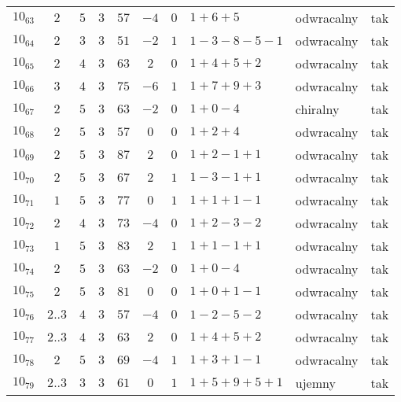 \begin{longtable}{lccccccllc}
$10_{63}$   &  $2$     &  $5$  &  $3$      &  $57$   &  $-4$  &  $0$  &  $1+6+5$        &  odwracalny  &  tak  \\
$10_{64}$   &  $2$     &  $3$  &  $3$      &  $51$   &  $-2$  &  $1$  &  $1-3-8-5-1$    &  odwracalny  &  tak  \\
$10_{65}$   &  $2$     &  $4$  &  $3$      &  $63$   &  $2$   &  $0$  &  $1+4+5+2$      &  odwracalny  &  tak  \\
$10_{66}$   &  $3$     &  $4$  &  $3$      &  $75$   &  $-6$  &  $1$  &  $1+7+9+3$      &  odwracalny  &  tak  \\
$10_{67}$   &  $2$     &  $5$  &  $3$      &  $63$   &  $-2$  &  $0$  &  $1+0-4$        &  chiralny    &  tak  \\
$10_{68}$   &  $2$     &  $5$  &  $3$      &  $57$   &  $0$   &  $0$  &  $1+2+4$        &  odwracalny  &  tak  \\
$10_{69}$   &  $2$     &  $5$  &  $3$      &  $87$   &  $2$   &  $0$  &  $1+2-1+1$      &  odwracalny  &  tak  \\
$10_{70}$   &  $2$     &  $5$  &  $3$      &  $67$   &  $2$   &  $1$  &  $1-3-1+1$      &  odwracalny  &  tak  \\
$10_{71}$   &  $1$     &  $5$  &  $3$      &  $77$   &  $0$   &  $1$  &  $1+1+1-1$      &  odwracalny  &  tak  \\
$10_{72}$   &  $2$     &  $4$  &  $3$      &  $73$   &  $-4$  &  $0$  &  $1+2-3-2$      &  odwracalny  &  tak  \\
$10_{73}$   &  $1$     &  $5$  &  $3$      &  $83$   &  $2$   &  $1$  &  $1+1-1+1$      &  odwracalny  &  tak  \\
$10_{74}$   &  $2$     &  $5$  &  $3$      &  $63$   &  $-2$  &  $0$  &  $1+0-4$        &  odwracalny  &  tak  \\
$10_{75}$   &  $2$     &  $5$  &  $3$      &  $81$   &  $0$   &  $0$  &  $1+0+1-1$      &  odwracalny  &  tak  \\
$10_{76}$   &  $2..3$  &  $4$  &  $3$      &  $57$   &  $-4$  &  $0$  &  $1-2-5-2$      &  odwracalny  &  tak  \\
$10_{77}$   &  $2..3$  &  $4$  &  $3$      &  $63$   &  $2$   &  $0$  &  $1+4+5+2$      &  odwracalny  &  tak  \\
$10_{78}$   &  $2$     &  $5$  &  $3$      &  $69$   &  $-4$  &  $1$  &  $1+3+1-1$      &  odwracalny  &  tak  \\
$10_{79}$   &  $2..3$  &  $3$  &  $3$      &  $61$   &  $0$   &  $1$  &  $1+5+9+5+1$    &  ujemny      &  tak  \\

\end{longtable}
